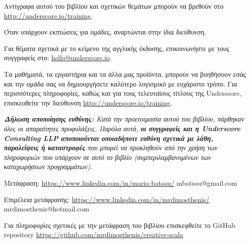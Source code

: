 \begin{center}

Αντίγραφα αυτού του βιβλίου και σχετικών θεμάτων μπορούν να βρεθούν στο \href{http://underscore.io/training}{http://underscore.io/training}.

Όταν υπάρχουν εκπτώσεις για ομάδες, αναρτώνται στην ίδια διεύθυνση.

Για θέματα σχετικά με το κείμενο της αγγλικής έκδοσης, επικοινωνήστε με τους συγγραφείς στο: \href{mailto:hello@underscore.io}{hello@underscore.io}.

\vspace{3em}

Τα μαθήματά, τα εργαστήρια και τα άλλα μας προϊόντα, μπορούν να βοηθήσουν εσάς και την ομάδα σας να δημιουργήσετε καλύτερο λογισμικό με ευχάριστο τρόπο. Για περισσότερες πληροφορίες, καθώς και για τους τελευταίους τίτλους της Underscore, επισκευθείτε την διεύθυνση \href{http://underscore.io/training}{http://underscore.io/training}.

\vspace{3em}

\textit{\textbf{Δήλωση αποποίησης ευθύνης:} Κατά την προετοιμασία αυτού του βιβλίου, πάρθηκαν όλες οι απαραίτητες προφυλάξεις. Παρόλα αυτά, \textbf{οι συγγραφείς και η Underscore Consulting LLP αποποιούνται οποιαδήποτε ευθύνη σχετικά με λάθη, παραλείψεις ή καταστροφές} που μπορεί να προκληθούν από την χρήση των πληροφοριών που υπάρχουν σε αυτό το βιβλίο (συμπεριλαμβανομένων των καταχωρήσεων προγραμμάτων).}

\vspace{3em}

Μετάφραση: \href{Μαρία Μπάτσου}{https://www.linkedin.com/in/maria-batsou/} mbatsou@gmail.com

\vspace{3em}

Επιμέλεια μετάφρασης: \href{Δημοσθένης Μιχαηλίδης}{https://www.linkedin.com/in/mrdimosthenis/} mrdimosthenis@hotmail.com

\vspace{3em}

Για πληροφορίες σχετικές με την μετάφραση του βιβλίου επισκεφθείτε το GitHub repository \href{mrdimosthenis/creative-scala}{https://github.com/mrdimosthenis/creative-scala}

\end{center}
